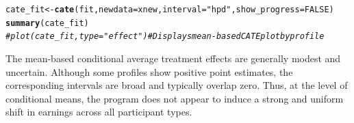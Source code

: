 \documentclass[article]{jss}\usepackage[]{graphicx}\usepackage[]{xcolor}
\makeatletter
\newcommand{\hlnum}[1]{\textcolor[rgb]{0.686,0.059,0.569}{#1}}%
\newcommand{\hlsng}[1]{\textcolor[rgb]{0.192,0.494,0.8}{#1}}%
\newcommand{\hlcom}[1]{\textcolor[rgb]{0.678,0.584,0.686}{\textit{#1}}}%
\newcommand{\hldef}[1]{\textcolor[rgb]{0.345,0.345,0.345}{#1}}%
\newcommand{\hlkwb}[1]{\textcolor[rgb]{0.69,0.353,0.396}{#1}}%
\newcommand{\hlkwc}[1]{\textcolor[rgb]{0.333,0.667,0.333}{#1}}%
\newcommand{\hlkwd}[1]{\textcolor[rgb]{0.737,0.353,0.396}{\textbf{#1}}}%
\newenvironment{kframe}{%
 \def\at@end@of@kframe{}%
 \ifinner\ifhmode%
  \def\at@end@of@kframe{\end{minipage}}%
  \begin{minipage}{\columnwidth}%
 \fi\fi%
 \def\FrameCommand##1{\hskip\@totalleftmargin \hskip-\fboxsep
 \colorbox{shadecolor}{##1}\hskip-\fboxsep
     \hskip-\linewidth \hskip-\@totalleftmargin \hskip\columnwidth}%
 \MakeFramed {\advance\hsize-\width
   \@totalleftmargin\z@ \linewidth\hsize
   \@setminipage}}%
 {\par\unskip\endMakeFramed%
 \at@end@of@kframe}
\newenvironment{knitrout}{}{} %
\DeclareRobustCommand{\code}[1]{\nolinkurl{#1}}
\makeatother
\begin{document}
\begin{table}[H]
\centering
\caption{\label{tab:xnew-results}Representative Lalonde participant profiles used as new-data inputs for the conditional causal contrasts in Figure~\ref{fig:cate_plot}. Columns (Profile~1--Profile~4) give the covariate values for one synthetic individual on the original data scale: \code{age} (years), \code{educ} (years of schooling), \code{race}, \code{married}, \code{nodegree}, and prior annual earnings \code{re74} and \code{re75} (US dollars).}
\centering
{}
\end{table}



\begin{knitrout}\footnotesize
{}\color{fgcolor}\begin{kframe}
\begin{alltt}
\hldef{cate_fit} \hlkwb{<-} \hlkwd{cate}\hldef{(fit,} \hlkwc{newdata} \hldef{= xnew,} \hlkwc{interval} \hldef{=} \hlsng{"hpd"}\hldef{,} \hlkwc{show_progress} \hldef{=} \hlnum{FALSE}\hldef{)}
\hlkwd{summary}\hldef{(cate_fit)}
\hlcom{# plot(cate_fit, type = "effect") # Displays mean-based CATE plot by profile}
\end{alltt}
\end{kframe}
\end{knitrout}

The mean-based conditional average treatment effects are generally
modest and uncertain. Although some profiles show positive point
estimates, the corresponding intervals are broad and typically overlap
zero. Thus, at the level of conditional means, the program does not
appear to induce a strong and uniform shift in earnings across all
participant types.
\end{document}
